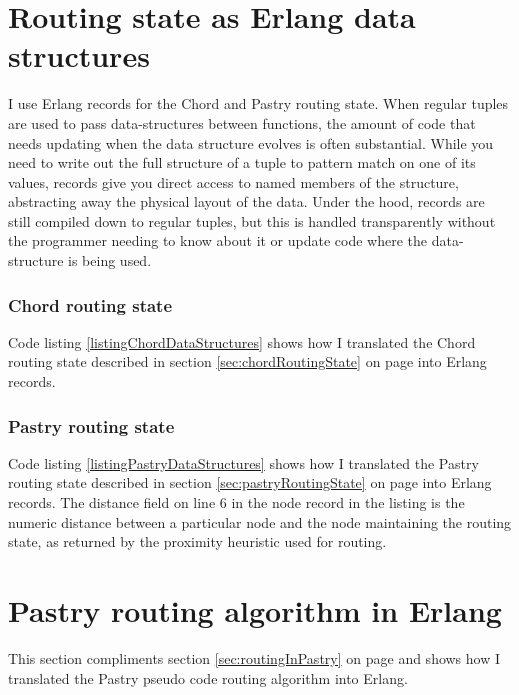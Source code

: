 \chapter{Routing state as Erlang data structures}
\label{sec:appendixErlangRoutingState}
I use Erlang records for the Chord and Pastry routing state.
When regular tuples are used to pass data-structures between functions, the amount of code that needs updating when the data structure evolves is often substantial.
While you need to write out the full structure of a tuple to pattern match on one of its values, records give you direct access to named members of the structure, abstracting away the physical layout of the data.
Under the hood, records are still compiled down to regular tuples, but this is handled transparently  without the programmer needing to know about it or update code where the data-structure is being used.

\subsection{Chord routing state}
Code listing \ref{listingChordDataStructures} shows how I translated the Chord routing state described in section \ref{sec:chordRoutingState} on page \pageref{sec:chordRoutingState} into Erlang records.



\subsection{Pastry routing state}
Code listing \ref{listingPastryDataStructures} shows how I translated the Pastry routing state described in section \ref{sec:pastryRoutingState} on page \pageref{sec:pastryRoutingState} into Erlang records.
The distance field on line 6 in the node record in the listing is the numeric distance between a particular node and the node maintaining the routing state, as returned by the proximity heuristic used for routing.



\chapter{Pastry routing algorithm in Erlang}
\label{sec:appendixErlangRoutingAlgorithm}
This section compliments section \ref{sec:routingInPastry} on page \pageref{sec:routingInPastry} and shows how I translated the Pastry pseudo code routing algorithm into Erlang.

